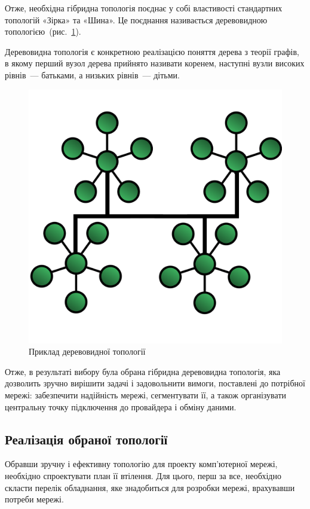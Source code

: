 \documentclass[
  ukrainian,
  simple,
  floatsection,
]{eskdnaukvd}
\newlength{\gridunitwidth}
\begin{document}
      Отже, необхідна гібридна топологія поєднає у собі властивості стандартних топологій «Зірка» та «Шина». Це поєднання називається деревовидною топологією~(рис.~\ref{fig:tree-topology}).

      Деревовидна топологія є конкретною реалізацією поняття дерева з теорії графів, в якому перший вузол дерева прийнято називати коренем, наступні вузли високих рівнів~— батьками, а низьких рівнів~— дітьми.

      \begin{figure}[!htbp]
        \centering
        \includegraphics[width = 8 \gridunitwidth]{./assets/04-topology-tree.png}
        \caption{Приклад деревовидної топології}
        \label{fig:tree-topology}
      \end{figure}

      Отже, в результаті вибору була обрана гібридна деревовидна топологія, яка дозволить зручно вирішити задачі і задовольнити вимоги, поставлені до потрібної мережі: забезпечити надійність мережі, сегментувати її, а також організувати центральну точку підключення до провайдера і обміну даними.

    \subsection{Реалізація обраної топології}
      Обравши зручну і ефективну топологію для проекту комп'ютерної мережі, необхідно спроектувати план її втілення. Для цього, перш за все, необхідно скласти перелік обладнання, яке знадобиться для розробки мережі, врахувавши потреби мережі.
\end{document}
